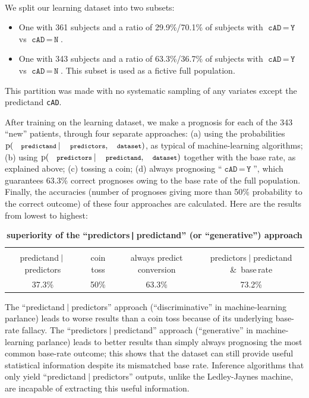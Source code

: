 \documentclass[utf8]{FrontiersinHarvard_mod} %
\newcommand*{\amp}{\&}
\newcommand*{\mo}[1][=]{\mathord{\,#1\,}}
\newcommand*{\p}{\mathrm{p}}%
\renewcommand*{\|}[1][]{\nonscript\:#1\vert\nonscript\:\mathopen{}}
\newcommand*{\cad}{\texttt{cAD}}
\newcommand*{\yes}{\texttt{Y}}
\newcommand*{\no}{\texttt{N}}
\newcommand*{\predictors}{\texttt{\footnotesize predictors}}
\newcommand*{\predictand}{\texttt{\footnotesize predictand}}
\newcommand*{\dataset}{\texttt{\footnotesize dataset}}
\newcommand*{\ljm}{Ledley-Jaynes machine}
\begin{document}
\begin{table}[b]
  \begin{framed}
  \small
  \caption{\small\bf superiority of the \enquote{predictors$\pmb{\|}$predictand} (or \enquote{generative}) approach}
  \label{tab:superiority_predictors_given_predictand}
  \mbox{}\\
  We split our learning dataset into two subsets:
    \begin{itemize}
    \item One with 361 subjects and a ratio of 29.9\%/70.1\% of subjects with $\cad\mo\yes$ vs $\cad\mo\no$.
    \item One with 343 subjects and a ratio of 63.3\%/36.7\% of subjects with $\cad\mo\yes$ vs $\cad\mo\no$. This subset is used as a fictive full population.
    \end{itemize}
    This partition was made with no systematic sampling of any variates except the predictand \cad.

    \smallskip After training on the learning dataset, we make a prognosis for each of the 343 \enquote{new} patients, through four separate approaches: (a) using the probabilities $\p(\predictand \| \predictors, \dataset)$, as typical of machine-learning algorithms; (b) using $\p(\predictors \| \predictand, \dataset)$ together with the base rate, as explained above; (c) tossing a coin; (d) always prognosing \enquote{$\cad\mo\yes$}, which guarantees 63.3\% correct prognoses owing to the base rate of the full population. Finally, the accuracies (number of prognoses giving more than 50\% probability to the correct outcome) of these four approaches are calculated. Here are the results from lowest to highest:

    \medskip
    { 
      \centering
      \begin{tabular}{cccc}
        \hline\\[-\jot]
        {\scriptsize predictand$\|$predictors}&{\scriptsize coin toss}&{\scriptsize always predict conversion}&{\scriptsize predictors$\|$predictand \amp\ base\,rate}
        \\[1\jot]
        37.3\% & 50\% & 63.3\% & 73.2\%\\[\jot]
        \hline
      \end{tabular}

    }
    \medskip
    
    The \enquote{predictand$\|$predictors} approach (\enquote{discriminative} in machine-learning parlance) leads to worse results than a coin toss because of its underlying base-rate fallacy. The \enquote{predictors$\|$predictand} approach (\enquote{generative} in machine-learning parlance) leads to better results than simply always prognosing the most common base-rate outcome; this shows that the dataset can still provide useful statistical information despite its mismatched base rate. Inference algorithms that only yield \enquote{predictand$\|$predictors} outputs, unlike the \ljm, are incapable of extracting this useful information.
  \end{framed}
\end{table}
\end{document}

